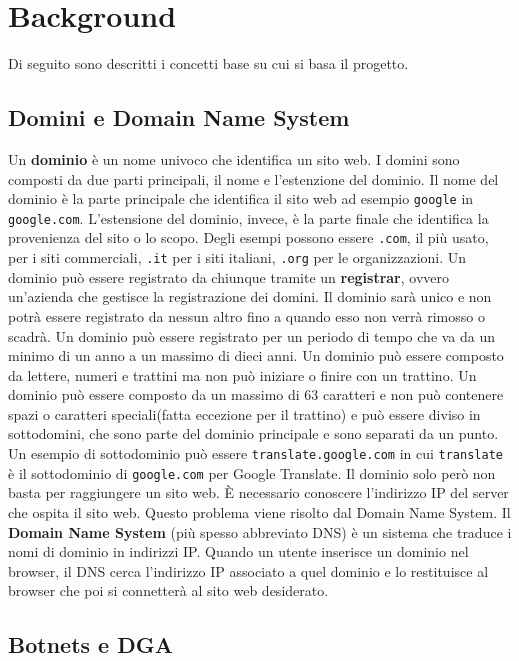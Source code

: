 \documentclass[12pt,a4paper,openright,twoside]{book}
\begin{document}

\chapter{Background}

Di seguito sono descritti i concetti base su cui si basa il progetto.

\section{Domini e Domain Name System}
Un \textbf{dominio} è un nome univoco che identifica un sito web.
I domini sono composti da due parti principali, il nome e l'estenzione del dominio.
Il nome del dominio è la parte principale che identifica il sito web
ad esempio \texttt{google} in \texttt{google.com}.
L'estensione del dominio, invece, è la parte finale
che identifica la provenienza del sito o lo scopo. Degli esempi possono essere
\texttt{.com}, il più usato, per i siti commerciali,
\texttt{.it} per i siti italiani, \texttt{.org} per le organizzazioni.
Un dominio può essere registrato da chiunque tramite
un \textbf{registrar}, ovvero
un'azienda che gestisce la registrazione dei domini.
Il dominio sarà unico e non potrà essere registrato da nessun altro
fino a quando esso non verrà rimosso o scadrà.
Un dominio può essere registrato per un periodo di tempo
che va da un minimo di un anno a un massimo di dieci anni.
Un dominio può essere composto da lettere, numeri e trattini
ma non può iniziare o finire con un trattino.
Un dominio può essere composto da un massimo di 63 caratteri
e non può contenere spazi o caratteri speciali(fatta eccezione per il trattino) e
può essere diviso in sottodomini, che sono
parte del dominio principale e sono separati da un punto.
Un esempio di sottodominio può essere \texttt{translate.google.com} in cui
\texttt{translate} è il sottodominio di \texttt{google.com} per Google Translate.
Il dominio solo però non basta per raggiungere un sito web.
È necessario conoscere l'indirizzo IP
del server che ospita il sito web. 
Questo problema viene risolto dal Domain Name System. \hfill \break
Il \textbf{Domain Name System} (più spesso abbreviato DNS)
è un sistema che traduce i nomi di dominio in indirizzi IP.
Quando un utente inserisce un dominio nel browser, il DNS
cerca l'indirizzo IP associato a quel dominio
e lo restituisce al browser che poi si connetterà al sito web desiderato. \raggedbottom

\section{Botnets e DGA}
\end{document}
